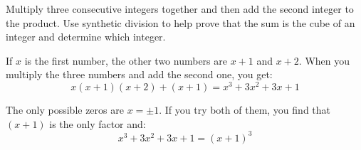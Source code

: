 \documentclass[fleqn,addpoints]{exam}
\begin{document}
\begin{questions}


      \bonusquestion[10]
        Multiply three consecutive integers together and then add the second integer to the product.  Use synthetic
        division to help prove that the sum is the cube of an integer and determine which integer.

        \begin{solution}
          If $x$ is the first number, the other two numbers are $x + 1$ and $x + 2$.  When you multiply the three
          numbers and add the second one, you get:
          \[
            x(x + 1)(x + 2) + (x + 1) = x^3 + 3x^2 + 3x + 1
          \]

          The only possible zeros are $x = \pm 1$.  If you try both of them, you find that $(x + 1)$ is the only
          factor and:
          \[
            x^3 + 3x^2 + 3x + 1 = (x + 1)^3
          \]


\end{solution}
\end{questions}
\end{document}
